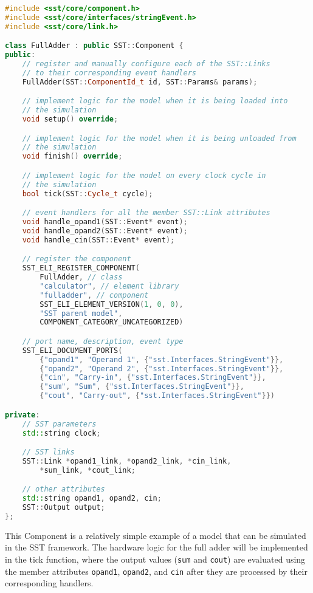 \documentclass[titlepage]{article}
\begin{document}
\begin{lstlisting}[language=c++]
#include <sst/core/component.h>
#include <sst/core/interfaces/stringEvent.h>
#include <sst/core/link.h>

class FullAdder : public SST::Component {
public:
    // register and manually configure each of the SST::Links
    // to their corresponding event handlers
    FullAdder(SST::ComponentId_t id, SST::Params& params);

    // implement logic for the model when it is being loaded into
    // the simulation
    void setup() override;

    // implement logic for the model when it is being unloaded from
    // the simulation
    void finish() override;

    // implement logic for the model on every clock cycle in
    // the simulation
    bool tick(SST::Cycle_t cycle);

    // event handlers for all the member SST::Link attributes
    void handle_opand1(SST::Event* event);
    void handle_opand2(SST::Event* event);
    void handle_cin(SST::Event* event);

    // register the component
    SST_ELI_REGISTER_COMPONENT(
        FullAdder, // class
        "calculator", // element library
        "fulladder", // component
        SST_ELI_ELEMENT_VERSION(1, 0, 0),
        "SST parent model",
        COMPONENT_CATEGORY_UNCATEGORIZED)

    // port name, description, event type
    SST_ELI_DOCUMENT_PORTS(
        {"opand1", "Operand 1", {"sst.Interfaces.StringEvent"}},
        {"opand2", "Operand 2", {"sst.Interfaces.StringEvent"}},
        {"cin", "Carry-in", {"sst.Interfaces.StringEvent"}},
        {"sum", "Sum", {"sst.Interfaces.StringEvent"}},
        {"cout", "Carry-out", {"sst.Interfaces.StringEvent"}})

private:
    // SST parameters
    std::string clock;

    // SST links
    SST::Link *opand1_link, *opand2_link, *cin_link, 
        *sum_link, *cout_link;

    // other attributes
    std::string opand1, opand2, cin;
    SST::Output output;
};
\end{lstlisting}

This Component is a relatively simple example of a model that can be simulated in the SST framework. The hardware logic for the full adder will be implemented in the tick function, where the output values (\texttt{sum} and \texttt{cout}) are evaluated using the member attributes \texttt{opand1}, \texttt{opand2}, and \texttt{cin} after they are processed by their corresponding handlers.
\end{document}
